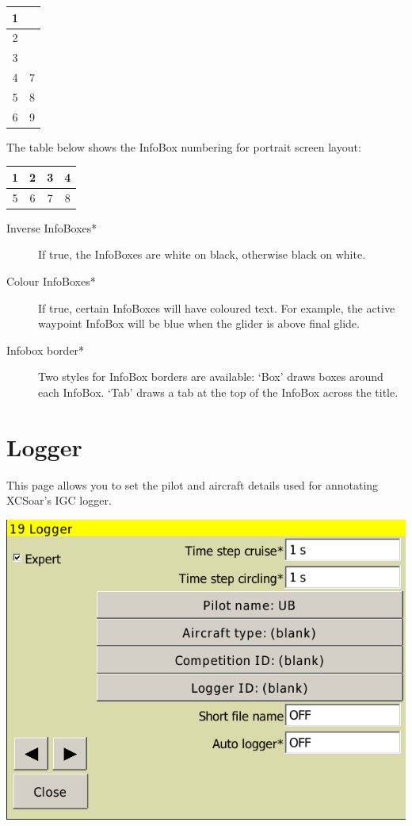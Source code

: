 \begin{tabular}{|c|c|}
\hline
1 &  \\
\hline
2 &  \\
\hline
3 &  \\
\hline
4 & 7 \\
\hline
5 & 8 \\
\hline
6 & 9 \\
\hline
\end{tabular}

The table below shows the InfoBox numbering for portrait screen layout:

\begin{tabular}{|c|c|c|c|}
\hline
1 & 2 & 3 & 4 \\
\hline
\hline
5 & 6 & 7 & 8 \\
\hline
\end{tabular}

\begin{description}
\item[Inverse InfoBoxes*]  If true, the InfoBoxes are white on black, otherwise black on white.
\item[Colour InfoBoxes*]  If true, certain InfoBoxes will have coloured text. For example, the 
active waypoint InfoBox will be blue when the glider is above final glide.
\item[Infobox border*]  Two styles for InfoBox borders are available: `Box'
draws boxes around each InfoBox.  `Tab' draws a tab at the top of the InfoBox across the title.
\end{description}


\clearpage
\section{Logger}

This page allows you to set the pilot and aircraft details used for
annotating XCSoar's IGC logger. 

\begin{center}
\includegraphics[angle=0,width=0.8\linewidth,keepaspectratio='true']{figures/config-logger.png}
\end{center}


